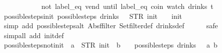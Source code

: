 \begin{isabellebody}
{\ \ \ \ \ \ \ \ \ \ {\isacharbar}{\isacharbraceright}{\isachardoublequoteclose}%
}%
\isamarkupfalse%
\ {\isachardoublequoteopen}{\isacharparenleft}not\ {\isacharparenleft}label_eq\ {\isacharprime}{\isacharprime}vend{\isacharprime}{\isacharprime}{\isacharparenright}\ until\ {\isacharparenleft}label_eq\ {\isacharprime}{\isacharprime}coin{\isacharprime}{\isacharprime}{\isacharparenright}{\isacharparenright}\ {\isacharparenleft}watch\ drinks\ t{\isacharparenright}{\isachardoublequoteclose}\isanewline
%
\isadelimproof
\ \ %
\endisadelimproof
%
\isatagproof
{}\isamarkupfalse%
%
\endisatagproof
{\isafoldproof}%
%
\isadelimproof
\isanewline
%
\endisadelimproof
\isanewline
{}\isamarkupfalse%
\ possible{\isacharunderscore}steps{\isacharunderscore}init{\isacharcolon}\ {\isachardoublequoteopen}possible{\isacharunderscore}steps\ drinks\ {}\ {\isacharless}{\isachargreater}\ STR\ {\isacharprime}{\isacharprime}init{\isacharprime}{\isacharprime}\ {\isacharbrackleft}{\isacharbrackright}\ {\isacharequal}\ {\isacharbraceleft}{\isacharbar}{\isacharparenleft}{}{\isacharcomma}\ init{\isacharparenright}{\isacharbar}{\isacharbraceright}{\isachardoublequoteclose}\isanewline
%
\isadelimproof
\ \ \ \ %
\endisadelimproof
%
\isatagproof
{}\isamarkupfalse%
\ {\isacharparenleft}simp\ add{\isacharcolon}\ possible{\isacharunderscore}steps{\isacharunderscore}alt\ Abs{\isacharunderscore}ffilter\ Set{\isachardot}filter{\isacharunderscore}def\ drinks{\isacharunderscore}def{\isacharparenright}\isanewline
\ \ \ \ \isamarkupfalse%
\ safe\isanewline
\ \ \isamarkupfalse%
\ {\isacharparenleft}simp{\isacharunderscore}all\ add{\isacharcolon}\ init{\isacharunderscore}def{\isacharparenright}%
\endisatagproof
{\isafoldproof}%
%
\isadelimproof
\isanewline
%
\endisadelimproof
\isanewline
{}\isamarkupfalse%
\ possible{\isacharunderscore}steps{\isacharunderscore}not{\isacharunderscore}init{\isacharcolon}\ {\isachardoublequoteopen}{\isasymnot}\ {\isacharparenleft}a\ {\isacharequal}\ STR\ {\isacharprime}{\isacharprime}init{\isacharprime}{\isacharprime}\ {\isasymand}\ b\ {\isacharequal}\ {\isacharbrackleft}{\isacharbrackright}{\isacharparenright}\ {\isasymLongrightarrow}\ possible{\isacharunderscore}steps\ drinks\ {}\ {\isacharless}{\isachargreater}\ a\ b\ {\isacharequal}\ {\isacharbraceleft}{\isacharbar}{\isacharbar}{\isacharbraceright}{\isachardoublequoteclose}\isanewline
%
\isadelimproof
\ \ \ \ %
\endisadelimproof
%
\isatagproof
{}\isamarkupfalse%

\end{isabellebody}
